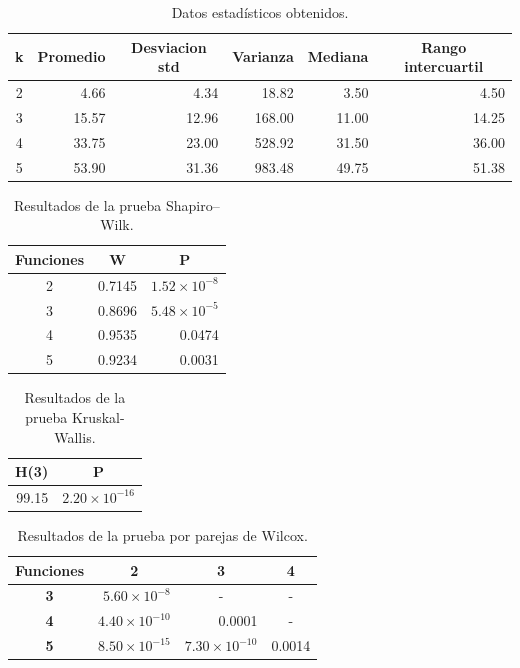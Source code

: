 \documentclass{article}
\begin{document}
\begin{table}[h!]
\centering
\caption{Datos estadísticos obtenidos.}
\label{tabla2}
\begin{tabular}{|c|r|r|r|r|r|}
\hline
\textbf{k} & \multicolumn{1}{c|}{\textbf{Promedio}} & \multicolumn{1}{c|}{\textbf{Desviacion std}} & \multicolumn{1}{c|}{\textbf{Varianza}} & \multicolumn{1}{c|}{\textbf{Mediana}} & \multicolumn{1}{c|}{\textbf{Rango intercuartil}} \\ \hline
2 & 4.66 & 4.34 & 18.82 & 3.50 & 4.50 \\ \hline
3 & 15.57 & 12.96 & 168.00 & 11.00 & 14.25 \\ \hline
4 & 33.75 & 23.00 & 528.92 & 31.50 & 36.00 \\ \hline
5 & 53.90 & 31.36 & 983.48 & 49.75 & 51.38 \\ \hline
\end{tabular}
\end{table}

\begin{table}[h!]
\centering
\caption{Resultados de la prueba Shapiro–Wilk.}
\label{tabla3}
\begin{tabular}{|c|r|r|}
\hline
\textbf{Funciones} & \multicolumn{1}{c|}{\textbf{W}} & \multicolumn{1}{c|}{\textbf{P}} \\ \hline
2 & 0.7145 & $1.52\times 10^{-8}$ \\ \hline
3 & 0.8696 & $5.48\times 10^{-5}$ \\ \hline
4 & 0.9535 & 0.0474 \\ \hline
5 & 0.9234 & 0.0031 \\ \hline
\end{tabular}
\end{table}

\begin{table}[h!]
\centering
\caption{Resultados de la prueba Kruskal-Wallis.}
\label{tabla4}
\begin{tabular}{|c|c|}
\hline
\textbf{H(3)} & \textbf{P} \\ \hline
\multicolumn{1}{|r|}{99.15} & \multicolumn{1}{r|}{$2.20\times 10^{-16}$} \\ \hline
\end{tabular}
\end{table}

\begin{table}[h!]
\centering
\caption{Resultados de la prueba por parejas de Wilcox.}
\label{tabla5}
\begin{tabular}{|c|r|c|c|}
\hline
\textbf{Funciones} & \multicolumn{1}{c|}{\textbf{2}} & \textbf{3} & \textbf{4} \\ \hline
\textbf{3} & $5.60\times 10^{-8}$ & - & - \\ \hline
\textbf{4} & $4.40\times 10^{-10}$ & \multicolumn{1}{r|}{0.0001} & - \\ \hline
\textbf{5} & $8.50\times 10^{-15}$ & \multicolumn{1}{r|}{$7.30\times 10^{-10}$} & \multicolumn{1}{r|}{0.0014} \\ \hline
\end{tabular}
\end{table}
\end{document}

